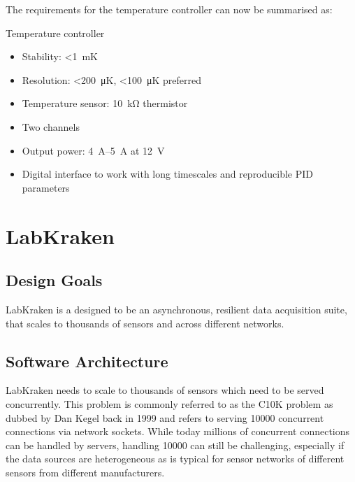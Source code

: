 The requirements for the temperature controller can now be summarised as:

\begin{center}
    \begin{specifications}[label={lst:dgTemp_requirements}]{Temperature controller}
    \begin{itemize}
        \item Stability: \qty{<1}{\milli \K}
        \item Resolution: \qty{<200}{\micro \K}, \qty{<100}{\micro \K} preferred
        \item Temperature sensor: \qty{10}{\kilo \ohm} thermistor
        \item Two channels
        \item Output power: \qtyrange{4}{5}{\A} at \qty{12}{\V}
        \item Digital interface to work with long timescales and reproducible PID parameters
    \end{itemize}
    \end{specifications}
\end{center}

\clearpage
\section{LabKraken}%
\label{sec:prep_labkraken}
\subsection{Design Goals}
LabKraken is a designed to be an asynchronous, resilient data acquisition suite, that scales to thousands of sensors and across different networks.
\subsection{Software Architecture}
LabKraken needs to scale to thousands of sensors which need to be served concurrently. This problem is commonly referred to as the C10K problem as dubbed by Dan Kegel back in 1999 \cite{10kProblem} and refers to serving \num{10000} concurrent connections via network sockets. While today millions of concurrent connections can be handled by servers, handling \num{10000} can still be challenging, especially if the data sources are heterogeneous as is typical for sensor networks of different sensors from different manufacturers.

